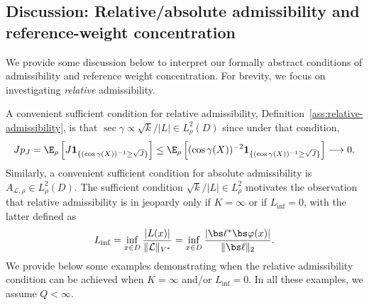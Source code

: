 \documentclass[10pt,dvipsnames]{amsart}
\begin{document}
\subsection{Discussion: Relative/absolute admissibility and reference-weight concentration} \label{ssec:assumptions-discussion}

We provide some discussion below to interpret our formally abstract conditions of admissibility and reference weight concentration. For brevity, we focus on investigating \textit{relative} admissibility. 

A convenient sufficient condition for relative admissibility, Definition~\ref{ass:relative-admissibility}, is that \( \sec \gamma \propto \sqrt{k}/|L| 
    \in L^2_\rho(D) \) since under that condition,
\begin{equation}\label{eq:relative-admissibility-sufficient}
    Jp_J = \E_\rho \left[J \mathbf 1_{\{ (\cos \gamma (X))^{-1} \ge \sqrt J \}}\right] \le  
    \E_\rho\left[
        (\cos \gamma (X))^{-2}
        \mathbf 1_{\{ (\cos \gamma (X))^{-1} \ge \sqrt J \}}
    \right]
    \longrightarrow 0.
\end{equation}
Similarly, a convenient sufficient condition for absolute admissibility is
\(
    A_{\mathcal L, \rho}\in L^2_\rho(D).
\)
The sufficient condition $\sqrt{k}/|L| \in L^2_\rho$ motivates the observation that relative admissibility is in jeopardy only if $K = \infty$  or if $L_{\inf} = 0$, with the latter defined as
\begin{equation}
\label{eq:Linf}
    L_{\inf}
    =
    \inf_{x\in D}
        \frac{|L(x)|}{\|\mathcal L\|_{V^*}}
    =
    \inf_{x\in D}
        \frac{|\bs\ell^*\bs\varphi(x)|}{\|\bs\ell\|_2}.
\end{equation}
We provide below some examples demonstrating when the relative admissibility condition can be achieved when $K = \infty$ and/or $L_{\inf} = 0$. In all these examples, we assume $Q < \infty$.
\end{document}
